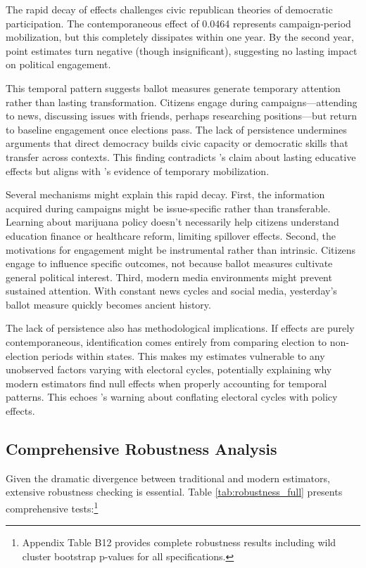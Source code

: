 \documentclass[12pt,letterpaper,oneside]{book}
\begin{document}
The rapid decay of effects challenges civic republican theories of democratic participation. The contemporaneous effect of 0.0464 represents campaign-period mobilization, but this completely dissipates within one year. By the second year, point estimates turn negative (though insignificant), suggesting no lasting impact on political engagement.

This temporal pattern suggests ballot measures generate temporary attention rather than lasting transformation. Citizens engage during campaigns---attending to news, discussing issues with friends, perhaps researching positions---but return to baseline engagement once elections pass. The lack of persistence undermines arguments that direct democracy builds civic capacity or democratic skills that transfer across contexts. This finding contradicts \citet{smith2004educated}'s claim about lasting educative effects but aligns with \citet{nicholson2003agenda}'s evidence of temporary mobilization.

Several mechanisms might explain this rapid decay. First, the information acquired during campaigns might be issue-specific rather than transferable. Learning about marijuana policy doesn't necessarily help citizens understand education finance or healthcare reform, limiting spillover effects. Second, the motivations for engagement might be instrumental rather than intrinsic. Citizens engage to influence specific outcomes, not because ballot measures cultivate general political interest. Third, modern media environments might prevent sustained attention. With constant news cycles and social media, yesterday's ballot measure quickly becomes ancient history.

The lack of persistence also has methodological implications. If effects are purely contemporaneous, identification comes entirely from comparing election to non-election periods within states. This makes my estimates vulnerable to any unobserved factors varying with electoral cycles, potentially explaining why modern estimators find null effects when properly accounting for temporal patterns. This echoes \citet{erikson2002timeline}'s warning about conflating electoral cycles with policy effects.

\subsection{Comprehensive Robustness Analysis}

Given the dramatic divergence between traditional and modern estimators, extensive robustness checking is essential. Table \ref{tab:robustness_full} presents comprehensive tests:\footnote{Appendix Table B12 provides complete robustness results including wild cluster bootstrap p-values for all specifications.}
\end{document}
